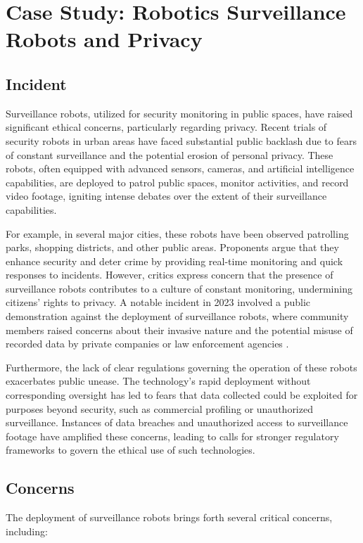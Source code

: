 \section{Case Study: Robotics Surveillance Robots and Privacy}

\subsection{Incident}
Surveillance robots, utilized for security monitoring in public spaces, have raised significant ethical concerns, particularly regarding privacy. Recent trials of security robots in urban areas have faced substantial public backlash due to fears of constant surveillance and the potential erosion of personal privacy. These robots, often equipped with advanced sensors, cameras, and artificial intelligence capabilities, are deployed to patrol public spaces, monitor activities, and record video footage, igniting intense debates over the extent of their surveillance capabilities.

For example, in several major cities, these robots have been observed patrolling parks, shopping districts, and other public areas. Proponents argue that they enhance security and deter crime by providing real-time monitoring and quick responses to incidents. However, critics express concern that the presence of surveillance robots contributes to a culture of constant monitoring, undermining citizens' rights to privacy. A notable incident in 2023 involved a public demonstration against the deployment of surveillance robots, where community members raised concerns about their invasive nature and the potential misuse of recorded data by private companies or law enforcement agencies \cite{brookings}.

Furthermore, the lack of clear regulations governing the operation of these robots exacerbates public unease. The technology's rapid deployment without corresponding oversight has led to fears that data collected could be exploited for purposes beyond security, such as commercial profiling or unauthorized surveillance. Instances of data breaches and unauthorized access to surveillance footage have amplified these concerns, leading to calls for stronger regulatory frameworks to govern the ethical use of such technologies.

\subsection{Concerns}
The deployment of surveillance robots brings forth several critical concerns, including:

